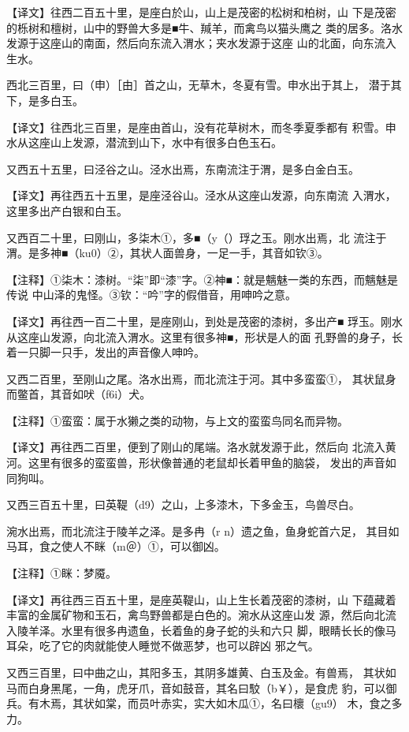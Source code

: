 \documentclass[a4paper,12pt,UTF8,twoside]{ctexbook}
\begin{document}
【译文】往西二百五十里，是座白於山，山上是茂密的松树和柏树，山 下是茂密的栎树和檀树，山中的野兽大多是■牛、羬羊，而禽鸟以猫头鹰之 类的居多。洛水发源于这座山的南面，然后向东流入渭水；夹水发源于这座 山的北面，向东流入生水。

西北三百里，曰（申）［由］首之山，无草木，冬夏有雪。申水出于其上， 潜于其下，是多白玉。

【译文】往西北三百里，是座由首山，没有花草树木，而冬季夏季都有 积雪。申水从这座山上发源，潜流到山下，水中有很多白色玉石。

又西五十五里，曰泾谷之山。泾水出焉，东南流注于渭，是多白金白玉。

【译文】再往西五十五里，是座泾谷山。泾水从这座山发源，向东南流 入渭水，这里多出产白银和白玉。

又西百二十里，曰刚山，多柒木①，多■（y（）琈之玉。刚水出焉，北 流注于渭。是多神■（ku0）②，其状人面兽身，一足一手，其音如钦③。

【注释】①柒木：漆树。“柒”即“漆”字。②神■：就是魑魅一类的东西，而魑魅是传说 中山泽的鬼怪。③钦：“吟”字的假借音，用呻吟之意。

【译文】再往西一百二十里，是座刚山，到处是茂密的漆树，多出产■ 琈玉。刚水从这座山发源，向北流入渭水。这里有很多神■，形状是人的面 孔野兽的身子，长着一只脚一只手，发出的声音像人呻吟。

又西二百里，至刚山之尾。洛水出焉，而北流注于河。其中多蛮蛮①， 其状鼠身而鳖首，其音如吠（f6i）犬。

【注释】①蛮蛮：属于水獭之类的动物，与上文的蛮蛮鸟同名而异物。

【译文】再往西二百里，便到了刚山的尾端。洛水就发源于此，然后向 北流入黄河。这里有很多的蛮蛮兽，形状像普通的老鼠却长着甲鱼的脑袋， 发出的声音如同狗叫。

又西三百五十里，曰英鞮（d9）之山，上多漆木，下多金玉，鸟兽尽白。

涴水出焉，而北流注于陵羊之泽。是多冉（r n）遗之鱼，鱼身蛇首六足， 其目如马耳，食之使人不眯（m＠）①，可以御凶。

【注释】①眯：梦魇。

【译文】再往西三百五十里，是座英鞮山，山上生长着茂密的漆树，山 下蕴藏着丰富的金属矿物和玉石，禽鸟野兽都是白色的。涴水从这座山发 源，然后向北流入陵羊泽。水里有很多冉遗鱼，长着鱼的身子蛇的头和六只 脚，眼睛长长的像马耳朵，吃了它的肉就能使人睡觉不做恶梦，也可以辟凶 邪之气。

又西三百里，曰中曲之山，其阳多玉，其阴多雄黄、白玉及金。有兽焉， 其状如马而白身黑尾，一角，虎牙爪，音如鼓音，其名曰駮（b￥），是食虎 豹，可以御兵。有木焉，其状如棠，而员叶赤实，实大如木瓜①，名曰櫰（gu9） 木，食之多力。
\end{document}
